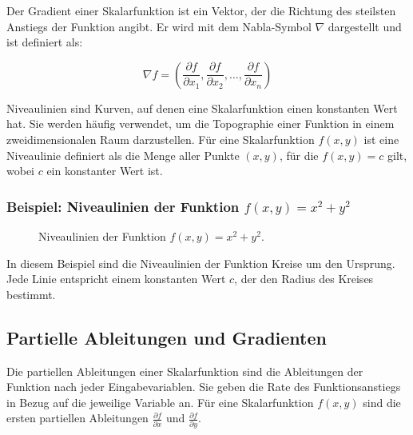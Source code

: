 \documentclass[11pt, openany]{book}
\begin{document}
Der Gradient einer Skalarfunktion ist ein Vektor, der die Richtung des steilsten Anstiegs der Funktion angibt. Er wird mit dem Nabla-Symbol $\nabla$ dargestellt und ist definiert als:

\[\nabla f = \left(\frac{\partial f}{\partial x_1}, \frac{\partial f}{\partial x_2}, \ldots, \frac{\partial f}{\partial x_n}\right)\]

Niveaulinien sind Kurven, auf denen eine Skalarfunktion einen konstanten Wert hat. Sie werden häufig verwendet, um die Topographie einer Funktion in einem zweidimensionalen Raum darzustellen. Für eine Skalarfunktion $f(x, y)$ ist eine Niveaulinie definiert als die Menge aller Punkte $(x, y)$, für die $f(x, y) = c$ gilt, wobei $c$ ein konstanter Wert ist.

\subsubsection{Beispiel: Niveaulinien der Funktion $f(x, y) = x^2 + y^2$}

\begin{figure}[ht]
\centering
{}
\caption{Niveaulinien der Funktion $f(x, y) = x^2 + y^2$.}
\label{fig:niveaulinien}
\end{figure}

In diesem Beispiel sind die Niveaulinien der Funktion Kreise um den Ursprung. Jede Linie entspricht einem konstanten Wert $c$, der den Radius des Kreises bestimmt.

\subsection{Partielle Ableitungen und Gradienten}

Die partiellen Ableitungen einer Skalarfunktion sind die Ableitungen der Funktion nach jeder Eingabevariablen. Sie geben die Rate des Funktionsanstiegs in Bezug auf die jeweilige Variable an. Für eine Skalarfunktion $f(x, y)$ sind die ersten partiellen Ableitungen $\frac{\partial f}{\partial x}$ und $\frac{\partial f}{\partial y}$. 
\end{document}
